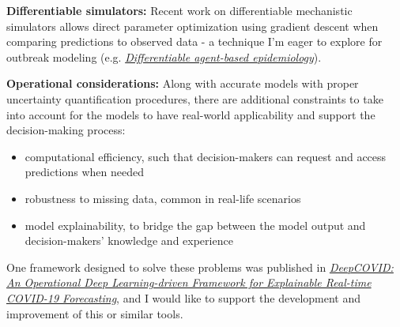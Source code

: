 \documentclass[11pt, a4paper]{awesome-cv}
\begin{document}
\begin{cvletter}
\textbf{Differentiable simulators:} Recent work on differentiable mechanistic simulators allows direct parameter optimization using gradient descent when comparing predictions to observed data - a technique I'm eager to explore for outbreak modeling (e.g. \href{https://dl.acm.org/doi/abs/10.5555/3545946.3598851}{\textit{Differentiable agent-based epidemiology}}).

\textbf{Operational considerations:} Along with accurate models with proper uncertainty quantification procedures, there are additional constraints to take into account for the models to have real-world applicability and support the decision-making process:
\begin{itemize}
  \item computational efficiency, such that decision-makers can request and access predictions when needed
  \item robustness to missing data, common in real-life scenarios
  \item model explainability, to bridge the gap between the model output and decision-makers' knowledge and experience
\end{itemize}
One framework designed to solve these problems was published in \href{https://ojs.aaai.org/index.php/AAAI/article/view/17808}{\textit{DeepCOVID: An Operational Deep Learning-driven Framework for Explainable Real-time COVID-19 Forecasting}}, and I would like to support the development and improvement of this or similar tools.

\end{cvletter}

\makeletterclosing
\end{document}

